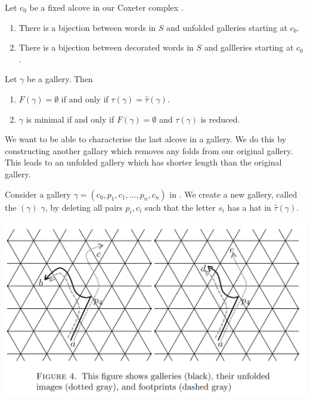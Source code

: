 \documentclass[11pt]{article}
\begin{document}
\begin{lemma}
    Let $c_0$ be a fixed alcove in our Coxeter complex \sg. 
    \begin{enumerate}
        \item There is a bijection between words in $S$ and unfolded galleries starting at $c_0$.
        \item There is a bijection between decorated words in $S$ and gallleries starting at $c_0$. 
    \end{enumerate}
\end{lemma}

\begin{lemma}
    Let $\gamma$ be a gallery. Then
    \begin{enumerate}
        \item $F(\gamma)=\emptyset$ if and only if $\tau(\gamma)=\hat{\tau}(\gamma).$
        \item $\gamma$ is minimal if and only if $F(\gamma)=\emptyset$ and $\tau(\gamma)$ is reduced.
    \end{enumerate}
\end{lemma}

We want to be able to characterise the last alcove in a gallery. We do this by constructing another gallary which removes any folds from our original gallery. This leads to an unfolded gallery which has shorter length than the original gallery.

\begin{definition}
    Consider a gallery $\gamma = (c_0,p_1,c_1,...,p_n,c_n)$ in \sg. We create a new gallery, called the  $(\gamma)$  $\gamma$, by deleting all pairs $p_i,c_i$ such that the letter $s_i$ has a hat in $\hat{\tau}(\gamma)$. 

\end{definition}

\includegraphics[scale=0.6]{Screenshot 2023-02-03 133522.png}\\
\end{document}
